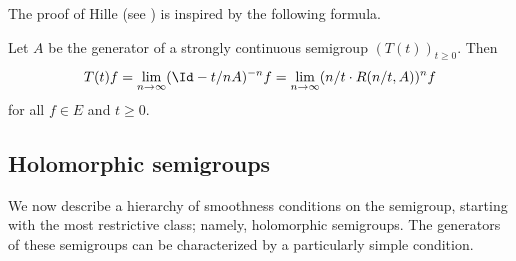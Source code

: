 The proof of Hille (see \textcite{kato:1976}) is inspired by the following formula.
\begin{proposition}\label{prop:a2-1.10}
Let $A$ be the generator of a strongly continuous semigroup $(T(t))_{t \geq 0}$.
Then
\begin{equation}\label{eq:a2-1.3}
    T(t)f = \lim_{n \to \infty} (\Id - t/nA)^{-n} f = \lim_{n \to \infty} (n/t \cdot R(n/t,A))^{n} f
\end{equation}
for all $f \in E$ and $t \geq 0$.
\end{proposition}
\subsection{Holomorphic semigroups} \label{subsec:a2-1.se4}%
We now describe a hierarchy of smoothness conditions on the semigroup, starting with the most restrictive class; namely, holomorphic semigroups.
The generators of these semigroups can be characterized by a particularly simple condition.

